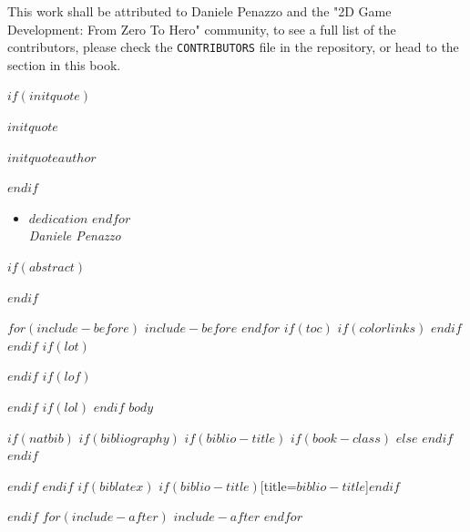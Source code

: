 \documentclass{article}
\begin{document}
\vspace{24pt}

This work shall be attributed to Daniele Penazzo and the "2D Game Development: From Zero To Hero" community, to see a full list of the contributors, please check the \texttt{CONTRIBUTORS} file in the repository, or head to the  section in this book.

\clearpage

\clearpage
\null
\vfill
\begin{minipage}[b]{\textwidth}
$if(initquote)$
\epigraph{$initquote$}{\textit{$initquoteauthor$}}
$endif$
\begin{itemize}[label={}]
    $for(dedication)$
        \item $dedication$
    $endfor$\\
    \textit{Daniele Penazzo}
\end{itemize}
\end{minipage}
\vfill
\cleardoublepage
\pagestyle{fancy}
\normalsize
$if(abstract)$
\begin{abstract}
$abstract$
\end{abstract}
$endif$

$for(include-before)$
$include-before$
$endfor$
$if(toc)$
{
$if(colorlinks)$
\hypersetup{linkcolor=$if(toccolor)$$toccolor$$else$black$endif$}
$endif$
\setcounter{tocdepth}{$toc-depth$}
\clearpage
\pagestyle{empty}
\null\clearpage
\pagestyle{fancy}
\tableofcontents
\clearpage
}
$endif$
$if(lot)$
\listoftables
$endif$
$if(lof)$
\listoffigures
$endif$
$if(lol)$
\lstlistoflistings
$endif$
\clearpage
{}
$body$

$if(natbib)$
$if(bibliography)$
$if(biblio-title)$
$if(book-class)$
\renewcommand\bibname{$biblio-title$}
$else$
\renewcommand\refname{$biblio-title$}
$endif$
$endif$


$endif$
$endif$
$if(biblatex)$
\printbibliography$if(biblio-title)$[title=$biblio-title$]$endif$

$endif$
$for(include-after)$
$include-after$
\pagebreak
$endfor$
\end{document}
